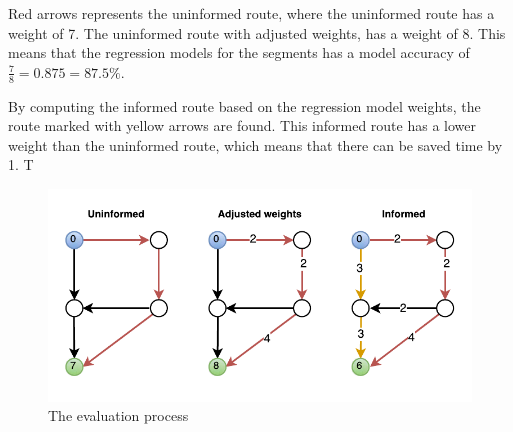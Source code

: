 Red arrows represents the uninformed route, where the uninformed route has a weight of 7. The uninformed route with adjusted weights, has a weight of 8. This means that the regression models for the segments has a model accuracy of $\frac{7}{8}=0.875=87.5\%$. 

By computing the informed route based on the regression model weights, the route marked with yellow arrows are found. This informed route has a lower weight than the uninformed route, which means that there can be saved time by 1. T

\begin{figure}
\centering
\includegraphics[width=\textwidth]{figures/eval.pdf}
\caption{The evaluation process}
\label{fig:eval}
\end{figure}

